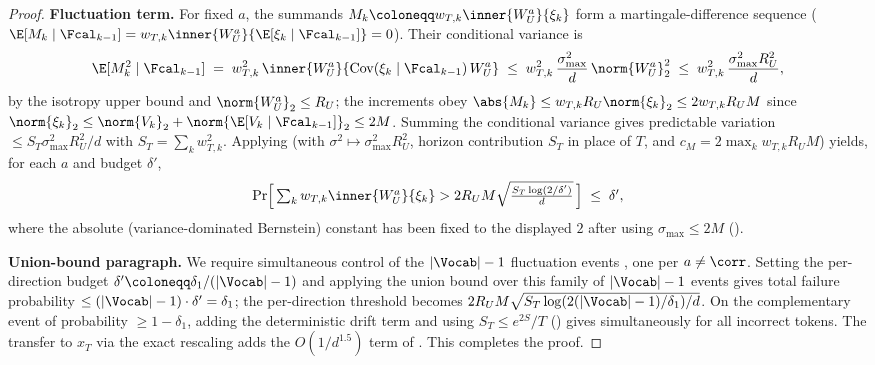 \begin{proof}
\smallskip\noindent\textbf{Fluctuation term.} For fixed $a$, the summands
$M_k\coloneqq w_{T,k}\inner{W_U^a}{\xi_k}$ form a martingale-difference
sequence ($\E[M_k\mid\Fcal_{k-1}]=w_{T,k}\inner{W_U^a}{\E[\xi_k\mid\Fcal_{k-1}]}=0$).
Their conditional variance is
\begin{align*}
   \E[M_k^2\mid\Fcal_{k-1}]
   \;=\; w_{T,k}^2\,\inner{W_U^a}{\operatorname{Cov}(\xi_k\mid\Fcal_{k-1})\,W_U^a}
   \;\le\; w_{T,k}^2\,\frac{\sigma_{\max}^2}{d}\,\norm{W_U^a}_2^2
   \;\le\; w_{T,k}^2\,\frac{\sigma_{\max}^2 R_U^2}{d},
\end{align*}
by the isotropy upper bound  and
$\norm{W_U^a}_2\le R_U$; the increments obey
$\abs{M_k}\le w_{T,k}R_U\norm{\xi_k}_2\le2 w_{T,k}R_U M$ since
$\norm{\xi_k}_2\le\norm{V_k}_2+\norm{\E[V_k\mid\Fcal_{k-1}]}_2\le2M$.
Summing the conditional variance gives predictable variation
$\le S_T\sigma_{\max}^2 R_U^2/d$ with $S_T=\sum_k w_{T,k}^2$. Applying
 (with $\sigma^2\mapsto\sigma_{\max}^2 R_U^2$, horizon
contribution $S_T$ in place of $T$, and $c_M=2\max_k w_{T,k}R_U M$) yields,
for each $a$ and budget $\delta'$,
\begin{align}\label{eq:incmax_flux}
   \Pr\Bigl[\,\textstyle\sum_k w_{T,k}\inner{W_U^a}{\xi_k}>2R_U M\sqrt{\tfrac{S_T\log(2/\delta')}{d}}\,\Bigr]
   \;\le\;\delta',
\end{align}
where the absolute (variance-dominated Bernstein) constant has been fixed
to the displayed $2$ after using $\sigma_{\max}\le2M$
().

\smallskip\noindent\textbf{Union-bound paragraph.} We require simultaneous
control of the $|\Vocab|-1$ fluctuation events , one
per $a\neq\corr$. Setting the per-direction budget
$\delta'\coloneqq\delta_1/(|\Vocab|-1)$ and applying the union bound over
this family of $|\Vocab|-1$ events gives total failure probability
$\le(|\Vocab|-1)\cdot\delta'=\delta_1$; the per-direction threshold becomes
$2R_U M\sqrt{S_T\log(2(|\Vocab|-1)/\delta_1)/d}$. On the complementary event
of probability $\ge1-\delta_1$, adding the deterministic drift term and
using $S_T\le e^{2S}/T$ () gives
 simultaneously for all incorrect tokens. The
transfer to $x_T$ via the exact rescaling  adds
the $O(1/d^{1.5})$ term of . This completes
the proof.
\end{proof}

